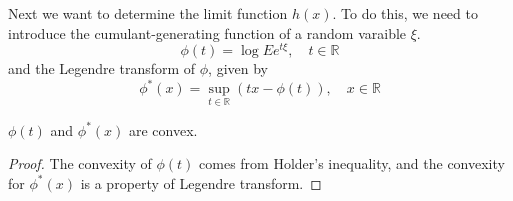 Next we want to determine the limit function $h(x)$. To do this, we need to introduce the cumulant-generating function of a random varaible $\xi$.
\[\phi(t)=\log E e^{t\xi},\quad t\in \mathbb{R}\]
and the Legendre transform of $\phi$, given by 
\[\phi^*(x)=\sup_{t\in \mathbb{R}}(tx-\phi(t)),\quad x\in\mathbb{R}\]
\begin{lemma}
    $\phi(t)$ and $\phi^*(x)$ are convex.
\end{lemma}
\begin{proof}
    The convexity of $\phi(t)$ comes from Holder's inequality, and the convexity for $\phi^*(x)$ is a property of Legendre transform.
\end{proof}
